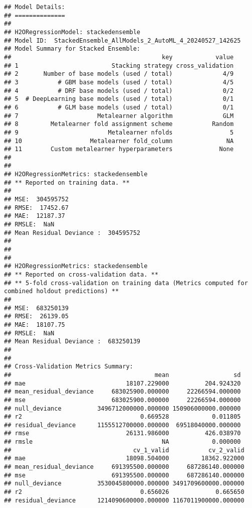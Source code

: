 \documentclass[
]{article}
\begin{document}
\begin{verbatim}
## Model Details:
## ==============
## 
## H2ORegressionModel: stackedensemble
## Model ID:  StackedEnsemble_AllModels_2_AutoML_4_20240527_142625 
## Model Summary for Stacked Ensemble: 
##                                          key            value
## 1                          Stacking strategy cross_validation
## 2       Number of base models (used / total)              4/9
## 3           # GBM base models (used / total)              4/5
## 4           # DRF base models (used / total)              0/2
## 5  # DeepLearning base models (used / total)              0/1
## 6           # GLM base models (used / total)              0/1
## 7                      Metalearner algorithm              GLM
## 8         Metalearner fold assignment scheme           Random
## 9                         Metalearner nfolds                5
## 10                   Metalearner fold_column               NA
## 11        Custom metalearner hyperparameters             None
## 
## 
## H2ORegressionMetrics: stackedensemble
## ** Reported on training data. **
## 
## MSE:  304595752
## RMSE:  17452.67
## MAE:  12187.37
## RMSLE:  NaN
## Mean Residual Deviance :  304595752
## 
## 
## 
## H2ORegressionMetrics: stackedensemble
## ** Reported on cross-validation data. **
## ** 5-fold cross-validation on training data (Metrics computed for combined holdout predictions) **
## 
## MSE:  683250139
## RMSE:  26139.05
## MAE:  18107.75
## RMSLE:  NaN
## Mean Residual Deviance :  683250139
## 
## 
## Cross-Validation Metrics Summary: 
##                                        mean                  sd
## mae                            18107.229000          204.924320
## mean_residual_deviance     683025900.000000     22266594.000000
## mse                        683025900.000000     22266594.000000
## null_deviance          3496712000000.000000 150906000000.000000
## r2                                 0.669528            0.011805
## residual_deviance      1155512700000.000000  69518040000.000000
## rmse                           26131.986000          426.038970
## rmsle                                    NA            0.000000
##                                  cv_1_valid           cv_2_valid
## mae                            18098.504000         18362.922000
## mean_residual_deviance     691395500.000000     687286140.000000
## mse                        691395500.000000     687286140.000000
## null_deviance          3530045800000.000000 3491709600000.000000
## r2                                 0.656026             0.665650
## residual_deviance      1214090600000.000000 1167011900000.000000

\end{verbatim}
\end{document}
